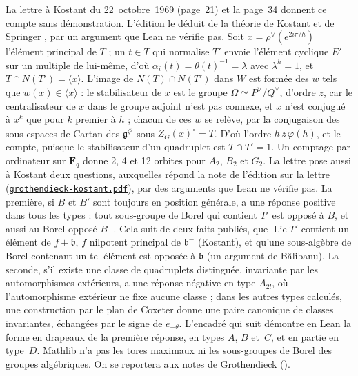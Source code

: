 {\small La lettre à Kostant du 22~octobre~1969 (page~21) et la page~34 donnent ce compte sans démonstration. L'édition le déduit de la théorie de Kostant et de Springer \cite{kostant1959,springer1974}, par un argument que Lean ne vérifie pas. Soit $x = \rho^\vee(e^{2i\pi/h})$ l'élément principal de $T$ ; un $t \in T$ qui normalise $T'$ envoie l'élément cyclique $E'$ sur un multiple de lui-même, d'où $\alpha_i(t) = \theta(t)^{-1} = \lambda$ avec $\lambda^h = 1$, et $T \cap N(T') = \langle x \rangle$. L'image de $N(T) \cap N(T')$ dans $W$ est formée des $w$ tels que $w(x) \in \langle x \rangle$ : le stabilisateur de $x$ est le groupe $\Omega \simeq P^\vee/Q^\vee$, d'ordre $z$, car le centralisateur de $x$ dans le groupe adjoint n'est pas connexe, et $x$ n'est conjugué à $x^k$ que pour $k$ premier à $h$ ; chacun de ces $w$ se relève, par la conjugaison des sous-espaces de Cartan des $\mathfrak g^{\zeta^j}$ sous $Z_G(x)^\circ = T$. D'où l'ordre $h\,z\,\varphi(h)$, et le compte, puisque le stabilisateur d'un quadruplet est $T \cap T' = 1$. Un comptage par ordinateur sur $\mathbf F_q$ donne 2, 4 et 12 orbites pour $A_2$, $B_2$ et $G_2$. La lettre pose aussi à Kostant deux questions, auxquelles répond la note de l'édition sur la lettre (\href{https://grothendieck.commutator.io/article/grothendieck-kostant.pdf}{\texttt{grothendieck-kostant.pdf}}), par des arguments que Lean ne vérifie pas. La première, si $B$ et $B'$ sont toujours en position générale, a une réponse positive dans tous les types : tout sous-groupe de Borel qui contient $T'$ est opposé à $B$, et aussi au Borel opposé $B^-$. Cela suit de deux faits publiés, que $\operatorname{Lie} T'$ contient un élément de $f + \mathfrak b$, $f$ nilpotent principal de $\mathfrak b^-$ (Kostant), et qu'une sous-algèbre de Borel contenant un tel élément est opposée à $\mathfrak b$ (un argument de Bălibanu). La seconde, s'il existe une classe de quadruplets distinguée, invariante par les automorphismes extérieurs, a une réponse négative en type $A_{2l}$, où l'automorphisme extérieur ne fixe aucune classe ; dans les autres types calculés, une construction par le plan de Coxeter donne une paire canonique de classes invariantes, échangées par le signe de $e_{-\theta}$. L'encadré qui suit démontre en Lean la forme en drapeaux de la première réponse, en types $A$, $B$ et~$C$, et en partie en type~$D$. Mathlib n'a pas les tores maximaux ni les sous-groupes de Borel des groupes algébriques. On se reportera aux notes de Grothendieck ().\par}


